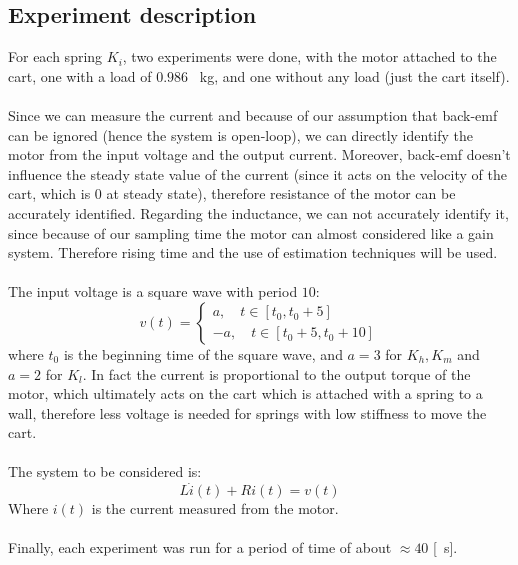 \subsection{Experiment description}
For each spring $K_i$, two experiments were done, with the motor attached to the cart,  one with a load of $0.986$ \SI{}{\kilo\gram}, and one without any load (just the cart itself). \\ \\
Since we can measure the current and because of our assumption that back-emf can be ignored (hence the system is open-loop), we can directly identify the motor from the input voltage and the output current. Moreover, back-emf doesn't influence the steady state value of the current (since it acts on the velocity of the cart, which is $0$ at steady state), therefore resistance of the motor can be accurately identified. Regarding the inductance, we can not accurately identify it, since because of our sampling time the motor can almost considered like a gain system. Therefore rising time and the use of estimation techniques will be used. \\ \\ 
The input voltage  is a square wave with period $10$:
$$v(t) = \begin{cases}
a, \quad t \in [t_0, t_0+5] \\
-a, \quad t \in [t_0+5,t_0+10]
\end{cases}
$$
where $t_0$ is the beginning time of the square wave, and $a=3$ for $K_h, K_m$ and $a=2$ for $K_l$. In fact the current is proportional to the output torque of the motor, which ultimately acts on the cart which is attached with a spring to a wall, therefore less voltage is needed for springs with low stiffness to move the cart. \\ \\ The system to be considered is:
$$L\dot{i}(t)+Ri(t) = v(t)$$
Where $i(t)$ is the current measured from the motor. \\ \\
Finally, each experiment was run for a period of time of about $\approx 40$ [\SI{}{\second }].
